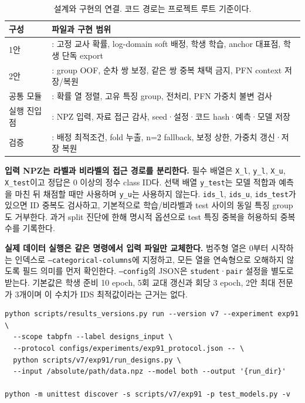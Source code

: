 \begin{table}[H]\centering\small
\caption{설계와 구현의 연결. 코드 경로는 프로젝트 루트 기준이다.}
\begin{tabularx}{\linewidth}{p{.22\linewidth}Y}
\toprule
구성 & 파일과 구현 범위\\\midrule
1안 & : 고정 교사 확률, log-domain soft 배정, 학생 학습, anchor 대표점, 학생 단독 export\\
2안 & : group OOF, 순차 쌍 보정, 같은 쌍 중복 채택 금지, PFN context 저장/복원\\
공통 모듈 & : 확률 열 정렬, 고유 특징 group, 전처리, PFN 가중치 불변 검사\\
실행 진입점 & : NPZ 입력, 자료 접근 감사, seed·설정·코드 hash·예측·모델 저장\\
검증 & : 배정 최적조건, fold 누출, n=2 fallback, 보정 상한, 가중치 갱신·저장 복원\\\bottomrule
\end{tabularx}
\end{table}

\textbf{입력 NPZ는 라벨과 비라벨의 접근 경로를 분리한다.} 필수 배열은 \texttt{X\_l}, \texttt{y\_l}, \texttt{X\_u}, \texttt{X\_test}이고 정답은 0 이상의 정수 class ID다. 선택 배열 \texttt{y\_test}는 모델 적합과 예측을 마친 뒤 채점할 때만 사용하며 \texttt{y\_u}는 사용하지 않는다. \texttt{ids\_l}, \texttt{ids\_u}, \texttt{ids\_test}가 있으면 ID 중복도 검사하고, 기본적으로 학습/비라벨과 test 사이의 동일 특징 group도 거부한다. 과거 split 진단에 한해 명시적 옵션으로 test 특징 중복을 허용하되 중복 수를 기록한다.

\textbf{실제 데이터 실행은 같은 명령에서 입력 파일만 교체한다.} 범주형 열은 0부터 시작하는 인덱스로 \texttt{--categorical-columns}에 지정하고, 모든 열을 연속형으로 오해하지 않도록 필드 의미를 먼저 확인한다. \texttt{--config}의 JSON은 \texttt{student}·\texttt{pair} 설정을 별도로 받는다. 기본값은 학생 준비 10 epoch, 5회 교대 갱신과 회당 3 epoch, 2안 최대 전문가 3개이며 이 수치가 IDS 최적값이라는 근거는 없다.
\begin{Verbatim}[fontsize=\footnotesize,breaklines=true]
python scripts/results_versions.py run --version v7 --experiment exp91 \
  --scope tabpfn --label designs_input \
  --protocol configs/experiments/exp91_protocol.json -- \
  python scripts/v7/exp91/run_designs.py \
  --input /absolute/path/data.npz --model both --output '{run_dir}'

python -m unittest discover -s scripts/v7/exp91 -p test_models.py -v
\end{Verbatim}

